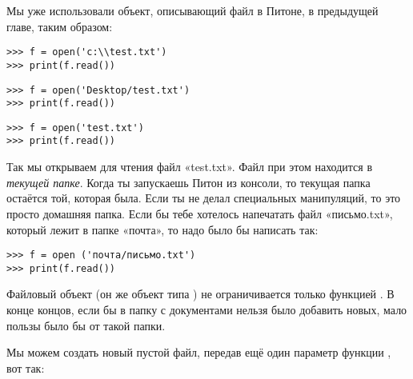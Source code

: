 Мы уже использовали объект, описывающий файл в Питоне, в предыдущей главе, таким образом:

\begin{WINDOWS}

\begin{listing}
\begin{verbatim}
>>> f = open('c:\\test.txt')
>>> print(f.read())
\end{verbatim}
\end{listing}

\end{WINDOWS}

\begin{MAC}

\begin{listing}
\begin{verbatim}
>>> f = open('Desktop/test.txt')
>>> print(f.read())
\end{verbatim}
\end{listing}

\end{MAC}

\begin{LINUX}

\begin{listing}
\begin{verbatim}
>>> f = open('test.txt')
>>> print(f.read())
\end{verbatim}
\end{listing}
 

Так мы открываем для чтения файл «test.txt». Файл при этом находится в \emph{текущей папке}. Когда ты запускаешь Питон из консоли, то текущая папка остаётся той, которая была. Если ты не делал специальных манипуляций, то это просто домашняя папка. Если бы тебе хотелось напечатать файл «письмо.txt», который лежит в папке «почта», то надо было бы написать так:
\begin{listing}
\begin{verbatim}
>>> f = open ('почта/письмо.txt')
>>> print(f.read())
\end{verbatim}
\end{listing}

\end{LINUX}

Файловый объект (он же объект типа ) не ограничивается только функцией . В конце концов, если бы в папку с документами нельзя было добавить новых, мало пользы было бы от такой папки.

Мы можем создать новый пустой файл, передав ещё один параметр функции , вот так:


